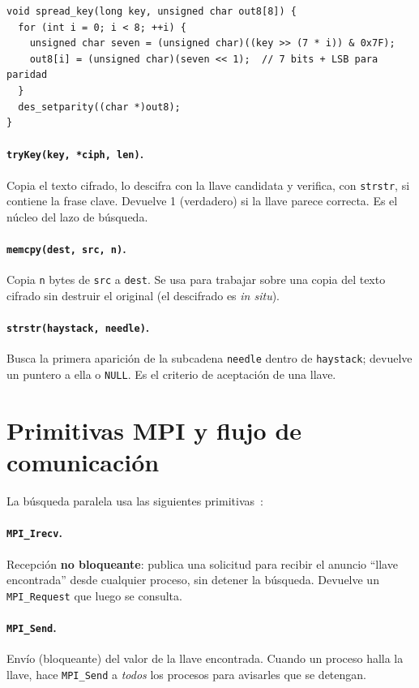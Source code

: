 \documentclass[11pt]{article}
\begin{document}
\begin{lstlisting}[caption={Expansión de llave corregida (src/common.c).}]
void spread_key(long key, unsigned char out8[8]) {
  for (int i = 0; i < 8; ++i) {
    unsigned char seven = (unsigned char)((key >> (7 * i)) & 0x7F);
    out8[i] = (unsigned char)(seven << 1);  // 7 bits + LSB para paridad
  }
  des_setparity((char *)out8);
}
\end{lstlisting}

\paragraph{\texttt{tryKey(key, *ciph, len)}.}
Copia el texto cifrado, lo descifra con la llave candidata y verifica, con \texttt{strstr}, si contiene
la frase clave. Devuelve 1 (verdadero) si la llave parece correcta. Es el núcleo del lazo de búsqueda.

\paragraph{\texttt{memcpy(dest, src, n)}.}
Copia \texttt{n} bytes de \texttt{src} a \texttt{dest}. Se usa para trabajar sobre una copia del texto
cifrado sin destruir el original (el descifrado es \emph{in situ}).

\paragraph{\texttt{strstr(haystack, needle)}.}
Busca la primera aparición de la subcadena \texttt{needle} dentro de \texttt{haystack}; devuelve un
puntero a ella o \texttt{NULL}. Es el criterio de aceptación de una llave.

\section{Primitivas MPI y flujo de comunicación}
La búsqueda paralela usa las siguientes primitivas~\cite{mpi40,pacheco2011}:

\paragraph{\texttt{MPI\_Irecv}.} Recepción \textbf{no bloqueante}: publica una solicitud para recibir el
anuncio ``llave encontrada'' desde cualquier proceso, sin detener la búsqueda. Devuelve un
\texttt{MPI\_Request} que luego se consulta.

\paragraph{\texttt{MPI\_Send}.} Envío (bloqueante) del valor de la llave encontrada. Cuando un proceso
halla la llave, hace \texttt{MPI\_Send} a \emph{todos} los procesos para avisarles que se detengan.
\end{document}
